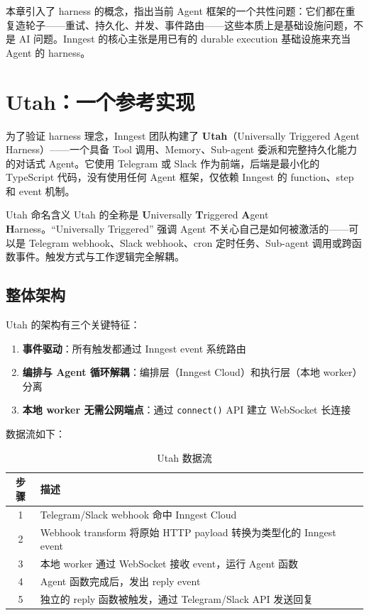 \documentclass[a4paper]{article}
\begin{document}
本章引入了 harness 的概念，指出当前 Agent 框架的一个共性问题：它们都在重复造轮子——重试、持久化、并发、事件路由——这些本质上是基础设施问题，不是 AI 问题。Inngest 的核心主张是用已有的 durable execution 基础设施来充当 Agent 的 harness。


\section{Utah：一个参考实现}

为了验证 harness 理念，Inngest 团队构建了 \textbf{Utah}（Universally Triggered Agent Harness）——一个具备 Tool 调用、Memory、Sub-agent 委派和完整持久化能力的对话式 Agent。它使用 Telegram 或 Slack 作为前端，后端是最小化的 TypeScript 代码，没有使用任何 Agent 框架，仅依赖 Inngest 的 function、step 和 event 机制。

\begin{knowledgebox}{Utah 命名含义}
Utah 的全称是 \textbf{U}niversally \textbf{T}riggered \textbf{A}gent \textbf{H}arness。``Universally Triggered'' 强调 Agent 不关心自己是如何被激活的——可以是 Telegram webhook、Slack webhook、cron 定时任务、Sub-agent 调用或跨函数事件。触发方式与工作逻辑完全解耦。
\end{knowledgebox}

\subsection{整体架构}

Utah 的架构有三个关键特征：

\begin{enumerate}
    \item \textbf{事件驱动}：所有触发都通过 Inngest event 系统路由
    \item \textbf{编排与 Agent 循环解耦}：编排层（Inngest Cloud）和执行层（本地 worker）分离
    \item \textbf{本地 worker 无需公网端点}：通过 \texttt{connect()} API 建立 WebSocket 长连接
\end{enumerate}

数据流如下：

\begin{table}[H]
\centering
\caption{Utah 数据流}
\begin{tabular}{cp{10cm}}
\toprule
\textbf{步骤} & \textbf{描述} \\
\midrule
1 & Telegram/Slack webhook 命中 Inngest Cloud \\
2 & Webhook transform 将原始 HTTP payload 转换为类型化的 Inngest event \\
3 & 本地 worker 通过 WebSocket 接收 event，运行 Agent 函数 \\
4 & Agent 函数完成后，发出 reply event \\
5 & 独立的 reply 函数被触发，通过 Telegram/Slack API 发送回复 \\
\bottomrule
\end{tabular}
\end{table}
\end{document}
